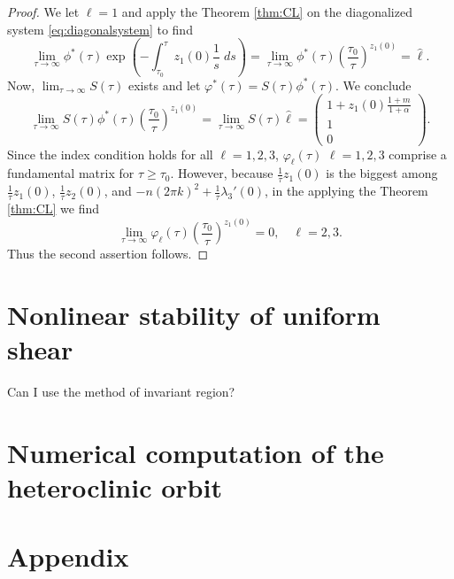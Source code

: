 \documentclass[a4paper,11pt]{article}
\def\blue{\color{blue}}
\theoremstyle{remark}
\begin{document}
\begin{proof}
We let $\ell=1$ and apply the Theorem \ref{thm:CL} on the diagonalized system \eqref{eq:diagonalsystem} to find
$$ \lim_{\tau \rightarrow \infty} \phi^*(\tau)\exp\left(-\int_{\tau_0}^\tau z_1(0)\frac{1}{s}\; ds\right) = \lim_{\tau \rightarrow \infty} \phi^*(\tau)\left(\frac{\tau_0}{\tau}\right)^{z_1(0)} = \hat{\ell}.$$
Now, $\displaystyle\lim_{\tau \rightarrow \infty} S(\tau)$ exists and let $\varphi^*(\tau) = S(\tau)\phi^*(\tau)$. We conclude
$$ \lim_{\tau \rightarrow \infty} S(\tau)\phi^*(\tau)\left(\frac{\tau_0}{\tau}\right)^{z_1(0)} = \lim_{\tau \rightarrow \infty}S(\tau)\hat{\ell} = \begin{pmatrix} 1+z_1(0)\frac{1+m}{1+\alpha}\\1\\0\end{pmatrix}.$$
Since the index condition holds for all $\ell=1,2,3$, $\varphi_\ell(\tau)$ $\ell=1,2,3$ comprise a fundamental matrix for $\tau\ge\tau_0$. However, because $\frac{1}{\tau}z_1(0)$ is the biggest among $\frac{1}{\tau}z_1(0)$, $\frac{1}{\tau}z_2(0)$, and $-n(2\pi k)^2 + \frac{1}{\tau}\lambda_3'(0)$, in the applying the Theorem \ref{thm:CL} we find 
$$ \lim_{\tau \rightarrow \infty} \varphi_\ell(\tau)\left(\frac{\tau_0}{\tau}\right)^{z_1(0)} = 0, \quad \ell=2,3.$$
Thus the second assertion follows.

\end{proof}



\section{Nonlinear stability of uniform shear}
{\blue Can I use the method of invariant region?}
% 
% 

\section{Numerical computation of the heteroclinic orbit}
 
\appendix
\section*{Appendix}
\renewcommand\thetheorem{\Alph{theorem}}
\setcounter{theorem}{\thetmp}
\end{document}
